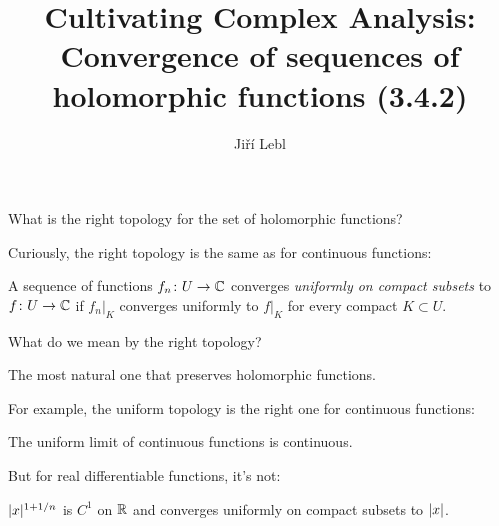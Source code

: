 \documentclass[10pt,aspectratio=169]{beamer}
\author{Ji\v{r}\'i Lebl}
\institute[OSU]{%
Departemento pri Matematiko de Oklahoma {\^S}tata Universitato}
\title{Cultivating Complex Analysis:\\%
Convergence of sequences of holomorphic functions (3.4.2)}
\date{}
\begin{document}
\begin{frame}
\titlepage
\end{frame}

\begin{frame}
What is the right topology for the set of holomorphic functions?

\medskip
\pause

Curiously, the right topology is the same as for continuous functions:

\begin{definition}
A sequence of functions $f_n \colon U \to {\mathbb{C}}$ converges
\emph{uniformly on compact subsets}
to $f \colon U \to {\mathbb{C}}$ if
$f_n|_K$ converges uniformly to $f|_K$
for every compact $K \subset U$.
\end{definition}

\medskip
\pause

What do we mean by the right topology?

The most natural one that preserves holomorphic functions.

\medskip
\pause

For example, the uniform topology is the right one for continuous functions:

The uniform limit of continuous functions is continuous.

\medskip
\pause

But for real differentiable functions, it's not:

\medskip
\pause

$\lvert {x} \rvert^{1+1/n}$ is $C^1$ on ${\mathbb{R}}$ and converges uniformly on compact
subsets to $\lvert {x} \rvert$.
\end{frame}
\end{document}
